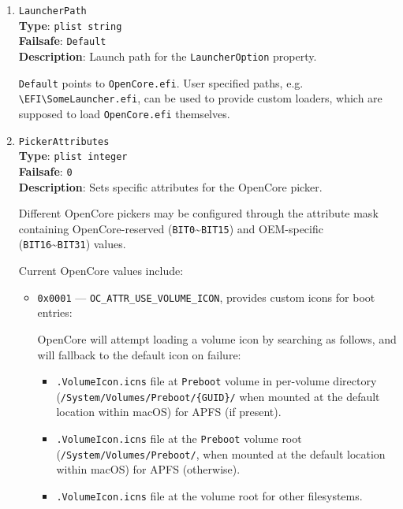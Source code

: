 \documentclass[]{article}
\providecommand{\tightlist}{%
  \setlength{\itemsep}{0pt}\setlength{\parskip}{0pt}}
\begin{document}
\begin{enumerate}
\item
  \texttt{LauncherPath}\\
  \textbf{Type}: \texttt{plist\ string}\\
  \textbf{Failsafe}: \texttt{Default}\\
  \textbf{Description}: Launch path for the \texttt{LauncherOption} property.

  \texttt{Default} points to \texttt{OpenCore.efi}. User specified paths,
  e.g. \texttt{\textbackslash EFI\textbackslash SomeLauncher.efi},
  can be used to provide custom loaders, which are supposed to
  load \texttt{OpenCore.efi} themselves.

\item
  \texttt{PickerAttributes}\\
  \textbf{Type}: \texttt{plist\ integer}\\
  \textbf{Failsafe}: \texttt{0}\\
  \textbf{Description}: Sets specific attributes for the OpenCore picker.

  Different OpenCore pickers may be configured through the attribute mask containing
  OpenCore-reserved (\texttt{BIT0}\textasciitilde\texttt{BIT15}) and OEM-specific
  (\texttt{BIT16}\textasciitilde\texttt{BIT31}) values.

  Current OpenCore values include:

  \begin{itemize}
  \tightlist
  \item \texttt{0x0001} --- \texttt{OC\_ATTR\_USE\_VOLUME\_ICON}, provides custom icons
    for boot entries:

    OpenCore will attempt loading a volume icon by searching
    as follows, and will fallback to the default icon on failure:
    \begin{itemize}
    \tightlist
      \item \texttt{.VolumeIcon.icns} file at \texttt{Preboot} volume in per-volume directory
       (\texttt{/System/Volumes/Preboot/\{GUID\}/} when mounted at the default location within
       macOS) for APFS (if present).
      \item \texttt{.VolumeIcon.icns} file at the \texttt{Preboot} volume root
      (\texttt{/System/Volumes/Preboot/}, when mounted at the default location within macOS)
      for APFS (otherwise).
      \item \texttt{.VolumeIcon.icns} file at the volume root for other filesystems.
    \end{itemize} \medskip


\end{itemize}
\end{enumerate}
\end{document}
